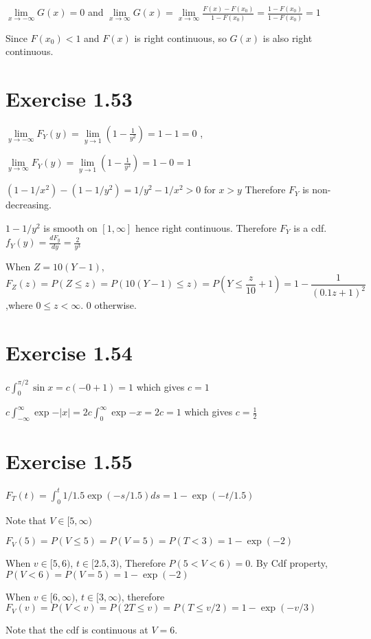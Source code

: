 \documentclass[12pt]{article}
\begin{document}
$\lim\limits_{x \rightarrow -\infty} G(x) = 0$ and $\lim\limits_{x \rightarrow \infty} G(x) = \lim\limits_{x \rightarrow \infty} \frac{F(x) - F(x_0)}{1-F(x_0)} = \frac{1 - F(x_0)}{1-F(x_0)} = 1 $

Since $F(x_0)<1$ and $F(x)$ is right continuous, so $G(x)$ is also right continuous.


\section*{Exercise 1.53}
$\lim\limits_{y\rightarrow -\infty}F_Y(y) = \lim\limits_{y\rightarrow 1} (1- \frac{1}{y^2}) = 1 -1 = 0$ , 

$\lim\limits_{y\rightarrow \infty}F_Y(y) = \lim\limits_{y\rightarrow 1} (1- \frac{1}{y^2}) = 1 - 0 = 1$ 

$ (1 - 1/x^2) - (1 - 1/y^2) = 1/y^2 - 1/x^2 > 0 $ for $ x > y$ Therefore $F_Y$ is non-decreasing.

$1 - 1/y^2$ is smooth on $[1,\infty]$ hence right continuous. Therefore $F_Y$ is a cdf.\\

$f_Y(y) = \frac{d F_y}{dy} = \frac{2}{y^3}$

When $Z=10(Y-1)$, $$F_Z(z) = P(Z\leq z) = P(10(Y-1) \leq z) = P(Y \leq \frac{z}{10} + 1) = 1 - \frac{1}{(0.1z + 1)^2}$$ ,where $0 \leq z < \infty$. 0 otherwise. 

\section*{Exercise 1.54}
$c \int_0^{\pi/2}\sin{x} = c(- 0 + 1) = 1$ which gives $c = 1$

$c \int_{-\infty}^{\infty} \exp{-|x|} = 2c \int_{0}^{\infty}\exp{-x} = 2c  = 1$ which gives $c = \frac{1}{2}$

\section*{Exercise 1.55}
$F_T(t) = \int_{0}^{t} 1/1.5 \exp(-s/1.5)ds = 1 - \exp(-t/1.5)$

Note that $V\in [5, \infty)$

$F_V(5) = P(V \leq 5)= P(V = 5) = P(T < 3) = 1 -\exp(-2)$

When $v \in [5, 6)$,  $t \in [2.5, 3)$, Therefore $P(5 < V < 6) = 0$. By Cdf property, $P(V < 6) = P(V=5) = 1 -\exp(-2)$

When $v \in [6, \infty)$, $t \in [3, \infty)$, therefore $F_V(v) = P(V < v) =  P(2T \leq v) = P(T \leq v/2) = 1 -\exp(-v/3)$

Note that the cdf is continuous at $V=6$.
\end{document}
